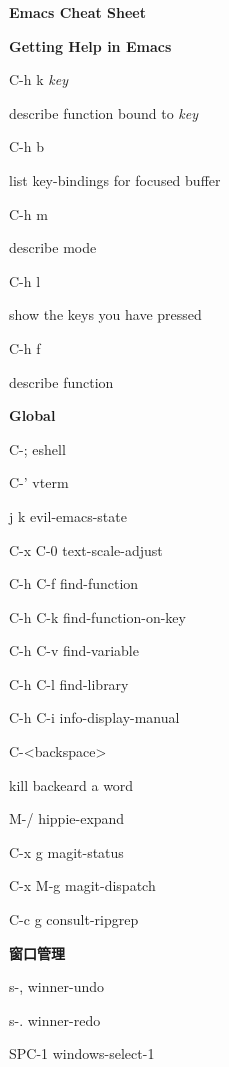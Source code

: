 \documentclass[10pt]{article}
\renewcommand\section[1]{\bigskip\par\textbf{\color{heading}\large#1}\smallskip}
\renewcommand\subsection[1]{\smallskip\par\textbf{\color{heading}#1}}
\newcommand\humanreadable[1]{{\par\color{default}\small\sffamily#1}}
\newcommand\meta[1]{\textlangle\textit{#1}\textrangle}
\begin{document}
\begin{multicols}{4}

  \setlength{\columnsep}{1cm}
  \begin{center}
    \LARGE\color{heading}\textbf{Emacs Cheat Sheet}
  \end{center}

  \section{Getting Help in Emacs}
  \begin{keylist}
  \item[C-h k \meta{key}] \humanreadable{describe function bound to \meta{key}}
  \item[C-h b] \humanreadable{list key-bindings for focused buffer}
  \item[C-h m] \humanreadable{describe mode}
  \item[C-h l] \humanreadable{show the keys you have pressed}
  \item[C-h f] \humanreadable{describe function}
  \end{keylist}

  \section{Global}
  \begin{keylist}
  \item[C-;] eshell
  \item[C-'] vterm
  \item[j k] evil-emacs-state
  \item[C-x C-0] text-scale-adjust
  \item[C-h C-f] find-function
  \item[C-h C-k] find-function-on-key
  \item[C-h C-v] find-variable
  \item[C-h C-l] find-library
  \item[C-h C-i] info-display-manual
  \item[C-<backspace>] \humanreadable{kill backeard a word}
  \item[M-/] hippie-expand
  \item[C-x g] magit-status
  \item[C-x M-g] magit-dispatch
  \item[C-c g] consult-ripgrep
  \end{keylist}

  \subsection{窗口管理}
  \begin{keylist}
  \item[s-,] winner-undo
  \item[s-.] winner-redo
  \item[SPC-1] windows-select-1


\end{keylist}
\end{multicols}
\end{document}
